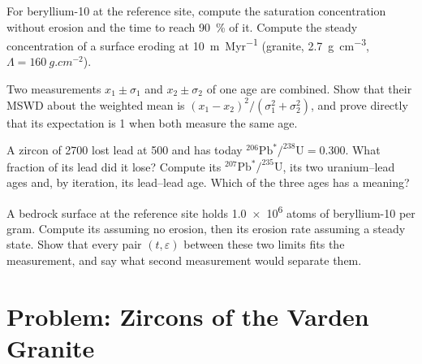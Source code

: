 \begin{exercise}[$\star\star$]\label{exo:b3:advanced-geochronology:9}
For beryllium-10 at the reference site, compute the saturation concentration
without erosion and the time to reach \qty{90}{\percent} of it. Compute the
steady concentration of a surface eroding at \qty{10}{m.Myr^{-1}} (granite,
\qty{2.7}{g.cm^{-3}}, $\Lambda = \qty{160}{g.cm^{-2}}$).
\end{exercise}

\begin{exercise}[$\star\star\star$]\label{exo:b3:advanced-geochronology:10}
Two measurements $x_1 \pm \sigma_1$ and $x_2 \pm \sigma_2$ of one age are
combined. Show that their MSWD about the weighted mean is
$(x_1 - x_2)^2/(\sigma_1^2 + \sigma_2^2)$, and prove directly that its
expectation is 1 when both measure the same age.
\end{exercise}

\begin{exercise}[$\star\star\star$]\label{exo:b3:advanced-geochronology:11}
A zircon of \qty{2700}{\Ma} lost lead at \qty{500}{\Ma} and has today
$^{206}\mathrm{Pb}^*/^{238}\mathrm{U} = 0.300$. What fraction of its lead did it
lose? Compute its $^{207}\mathrm{Pb}^*/^{235}\mathrm{U}$, its two uranium--lead
ages and, by iteration, its lead--lead age. Which of the three ages has a
meaning?
\end{exercise}

\begin{exercise}[$\star\star\star$]\label{exo:b3:advanced-geochronology:12}
A bedrock surface at the reference site holds \num{1.0e6} atoms of
beryllium-10 per gram. Compute its  assuming no erosion, then its
erosion rate assuming a steady state. Show that every pair $(t, \varepsilon)$
between these two limits fits the measurement, and say what second
measurement would separate them.
\end{exercise}

\section{Problem: Zircons of the Varden Granite}

